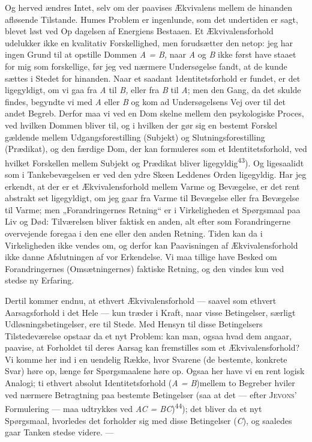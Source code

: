 \documentclass[12pt,a4paper,openany]{book}
\newcommand{\opage}[1]{\marginnote{\footnotesize\textit{[#1]}}}
\begin{document}
Og herved ændres Intet, selv om der paavises Ækvivalens mellem de hinanden
afløsende Tilstande. Humes Problem er ingenlunde, som det undertiden er sagt,
blevet løst ved Op%
\opage{47}dagelsen af Energiens Bestaaen. Et Ækvivalensforhold udelukker ikke
en kvalitativ Forskellighed, men forudsætter den netop: jeg har ingen Grund til
at opstille Dommen \textit{A = B,} naar \textit{A} og \textit{B} ikke først
have staaet for mig som forskellige, før jeg ved nærmere Undersøgelse fandt, at
de kunde sættes i Stedet for hinanden. Naar et saadant 1dentitetsforhold %
 er fundet, er det ligegyldigt, om vi gaa fra \textit{A} til \textit{B,} eller
fra \textit{B} til \textit{A}; men den Gang, da det skulde findes, begyndte vi
med \textit{A} eller \textit{B} og kom ad Undersøgelsens Vej over til det andet
Begreb. Derfor maa vi ved en Dom skelne mellem den psykologiske Proces, ved
hvilken Dommen bliver til, og i hvilken der gør sig en bestemt Forskel gældende
mellem Udgangsforestilling (Subjekt) og Slutningsforestilling (Prædikat), og
den færdige Dom, der kan formuleres som et Identitetsforhold, ved hvilket
Forskellen mellem Subjekt og Prædikat bliver ligegyldig\textsuperscript{43}).
Og ligesaalidt som i Tankebevægelsen er ved den ydre Skeen Leddenes Orden
ligegyldig. Har jeg erkendt, at der er et Ækvivalensforhold mellem Varme og
Bevægelse, er det rent abstrakt set ligegyldigt, om jeg gaar fra Varme til
Bevægelse eller fra Bevægelse til Varme; men „Forandringernes Retning“ er i
Virkeligheden et Spørgsmaal paa Liv og Død: Tilværelsen bliver faktisk en
anden, alt efter som Forandringerne overvejende foregaa i den ene eller den
anden Retning. Tiden kan da i Virkeligheden ikke vendes om, og derfor kan
Paavisningen af Ækvivalensforhold ikke danne Afslutningen af vor Erkendelse. Vi
maa tillige have Besked om Forandringernes (Omsætningernes) faktiske Retning,
og den vindes kun ved stedse ny Erfaring.

Dertil kommer endnu, at ethvert Ækvivalensforhold --- saavel som ethvert
Aarsagsforhold i det Hele --- kun træder i Kraft, naar visse Betingelser,
særligt Udløsningsbetingelser, ere til Stede. Med Hensyn til disse Betingelsers
Tilstedeværelse opstaar da et nyt Problem: kan man, ogsaa hvad dem angaar,
paavise, at Forholdet til deres Aarsag kan fremstilles som et
Ækvivalensforhold? Vi komme her ind i en uendelig Række, hvor Svarene (de
bestemte, konkrete Svar) høre op, længe før Spørgsmaalene høre op. Ogsaa her
have vi en rent logisk Analogi; ti ethvert absolut Identitetsforhold (\textit{A
= B})mellem to
\opage{48}Begreber hviler ved nærmere Betragtning paa bestemte Betingelser (saa
at det --- efter \textsc{Jevons}' Formulering --- maa udtrykkes ved \textit{AC
= BC})\textsuperscript{44}); det bliver da et nyt Spørgsmaal, hvorledes det
forholder sig med disse Betingelser (\textit{C}), og saaledes gaar Tanken
stedse videre. ---
\end{document}
